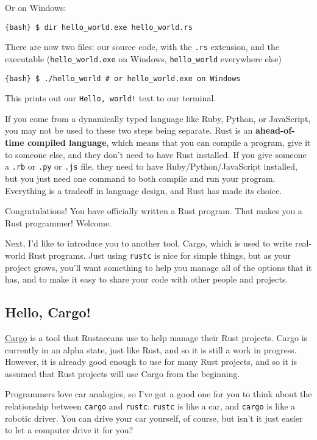 \documentclass[]{article}
\begin{document}
Or on Windows:

\texttt{\{bash\} \$ dir hello\_world.exe  hello\_world.rs}

There are now two files: our source code, with the \texttt{.rs}
extension, and the executable (\texttt{hello\_world.exe} on Windows,
\texttt{hello\_world} everywhere else)

\texttt{\{bash\} \$ ./hello\_world  \# or hello\_world.exe on Windows}

This prints out our \texttt{Hello, world!} text to our terminal.

If you come from a dynamically typed language like Ruby, Python, or
JavaScript, you may not be used to these two steps being separate. Rust
is an \textbf{ahead-of-time compiled language}, which means that you can
compile a program, give it to someone else, and they don't need to have
Rust installed. If you give someone a \texttt{.rb} or \texttt{.py} or
\texttt{.js} file, they need to have Ruby/Python/JavaScript installed,
but you just need one command to both compile and run your program.
Everything is a tradeoff in language design, and Rust has made its
choice.

Congratulations! You have officially written a Rust program. That makes
you a Rust programmer! Welcome.

Next, I'd like to introduce you to another tool, Cargo, which is used to
write real-world Rust programs. Just using \texttt{rustc} is nice for
simple things, but as your project grows, you'll want something to help
you manage all of the options that it has, and to make it easy to share
your code with other people and projects.

\subsection{Hello, Cargo!}\label{hello-cargo}

\href{http://crates.io}{Cargo} is a tool that Rustaceans use to help
manage their Rust projects. Cargo is currently in an alpha state, just
like Rust, and so it is still a work in progress. However, it is already
good enough to use for many Rust projects, and so it is assumed that
Rust projects will use Cargo from the beginning.

Programmers love car analogies, so I've got a good one for you to think
about the relationship between \texttt{cargo} and \texttt{rustc}:
\texttt{rustc} is like a car, and \texttt{cargo} is like a robotic
driver. You can drive your car yourself, of course, but isn't it just
easier to let a computer drive it for you?
\end{document}
